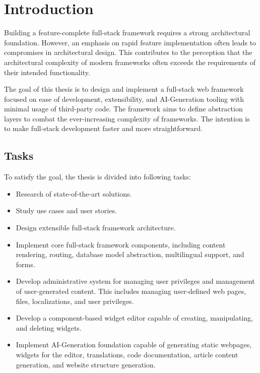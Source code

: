 \chapter{Introduction}\label{ch:introduction}
Building a feature-complete full-stack framework requires a strong architectural foundation.
However, an emphasis on rapid feature implementation often leads to compromises in architectural design.
This contributes to the perception that the architectural complexity of modern frameworks often exceeds the requirements
of their intended functionality.

The goal of this thesis is to design and implement a full-stack web framework focused on ease of development,
extensibility, and AI-Generation tooling with minimal usage of third-party code.
The framework aims to define abstraction layers to combat the ever-increasing complexity of frameworks.
The intention is to make full-stack development faster and more straightforward.

\section{Tasks}\label{sec:introduction-tasks}
To satisfy the goal, the thesis is divided into following tasks:

\begin{itemize}
    \item Research of state-of-the-art solutions.
    \item Study use cases and user stories.
    \item Design extensible full-stack framework architecture.
    \item Implement core full-stack framework components, including content rendering, routing, database model abstraction,
        multilingual support, and forms.
    \item Develop administrative system for managing user privileges and management of user-generated content.
        This includes managing user-defined web pages, files, localizations, and user privileges.
    \item Develop a component-based widget editor capable of creating, manipulating, and deleting widgets.
    \item Implement AI-Generation foundation capable of generating static webpages, widgets for the editor, translations,
        code documentation, article content generation, and website structure generation.
\end{itemize}

